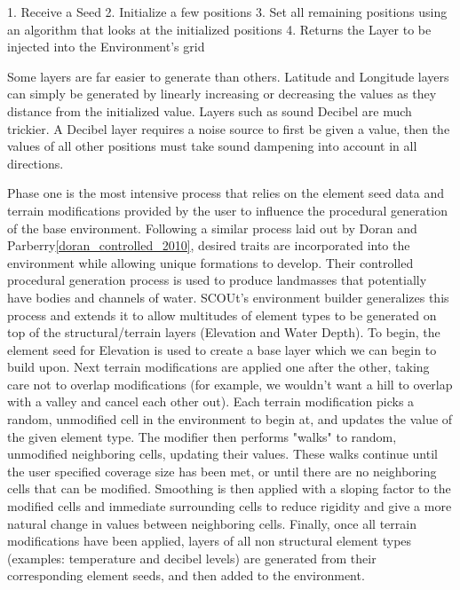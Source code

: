 1.	Receive a Seed
2.	Initialize a few positions
3.	Set all remaining positions using an algorithm that looks at the initialized positions
4.	Returns the Layer to be injected into the Environment’s grid

Some layers are far easier to generate than others.
Latitude and Longitude layers can simply be generated by linearly increasing or decreasing the values as they distance from the initialized value.
Layers such as sound Decibel are much trickier.
A Decibel layer requires a noise source to first be given a value, then the values of all other positions must take sound dampening into account in all directions.


Phase one is the most intensive process that relies on the element seed data and terrain modifications provided by the user to influence the procedural generation of the base environment.
Following a similar process laid out by Doran and Parberry\ref{doran_controlled_2010}, desired traits are incorporated into the environment while allowing unique formations to develop.
Their controlled procedural generation process is used to produce landmasses that potentially have bodies and channels of water.
SCOUt's environment builder generalizes this process and extends it to allow multitudes of element types to be generated on top of the structural/terrain layers (Elevation and Water Depth).
To begin, the element seed for Elevation is used to create a base layer which we can begin to build upon.
Next terrain modifications are applied one after the other, taking care not to overlap modifications (for example, we wouldn't want a hill to overlap with a valley and cancel each other out).
Each terrain modification picks a random, unmodified cell in the environment to begin at, and updates the value of the given element type.
The modifier then performs "walks" to random, unmodified neighboring cells, updating their values.
These walks continue until the user specified coverage size has been met, or until there are no neighboring cells that can be modified.
Smoothing is then applied with a sloping factor to the modified cells and immediate surrounding cells to reduce rigidity and give a more natural change in values between neighboring cells.
Finally, once all terrain modifications have been applied, layers of all non structural element types (examples: temperature and decibel levels) are generated from their corresponding element seeds, and then added to the environment.

